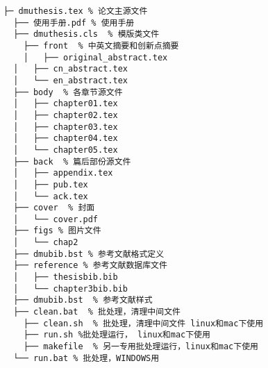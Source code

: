 \begin{lstlisting}[basicstyle=\small\ttfamily,caption={模板文件布局},label=layout,numbers=none]
  ├─ dmuthesis.tex % 论文主源文件
  ├── 使用手册.pdf % 使用手册
  ├── dmuthesis.cls  % 模版类文件
	├── front  % 中英文摘要和创新点摘要
	│   ├── original_abstract.tex
  │   ├── cn_abstract.tex
  │   └── en_abstract.tex
  ├── body  % 各章节源文件
  │   ├── chapter01.tex
  │   ├── chapter02.tex
  │   ├── chapter03.tex
  │   ├── chapter04.tex
  │   └── chapter05.tex
  ├── back  % 篇后部份源文件
  │   ├── appendix.tex
  │   ├── pub.tex
  │   └── ack.tex
  ├── cover  % 封面
  │   └── cover.pdf
  ├── figs % 图片文件
  │   └── chap2
  ├── dmubib.bst % 参考文献格式定义
  ├── reference % 参考文献数据库文件
  │   ├── thesisbib.bib
  │   └── chapter3bib.bib
  ├── dmubib.bst  % 参考文献样式
  ├── clean.bat  % 批处理，清理中间文件
	├── clean.sh  % 批处理，清理中间文件 linux和mac下使用
	├── run.sh %批处理运行， linux和mac下使用
	├── makefile  % 另一专用批处理运行，linux和mac下使用
  └── run.bat % 批处理，WINDOWS用
\end{lstlisting}
